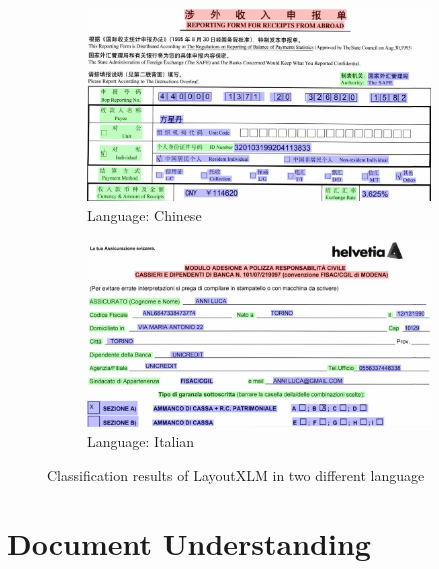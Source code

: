 \begin{figure}[!ht]
    \begin{subfigure}{\textwidth}
    \centering
    \includegraphics[scale=0.3]{chapters/images/Literature_review/LayoutXLM_Results_Chinese.JPG}
    \caption{Language: Chinese}
    \label{subfig:a}
    \end{subfigure}
    \begin{subfigure}{\textwidth}
    \centering
    \includegraphics[scale=0.3]{chapters/images/Literature_review/LayoutXLM_Results_Italian.JPG}
    \caption{Language: Italian}
    \label{subfig:b}
    \end{subfigure}
    \caption{Classification results of LayoutXLM in two different language \cite{xu2021layoutxlm}}\label{fig:result_of_LayoutXLM}
\end{figure}








\section{Document Understanding}

